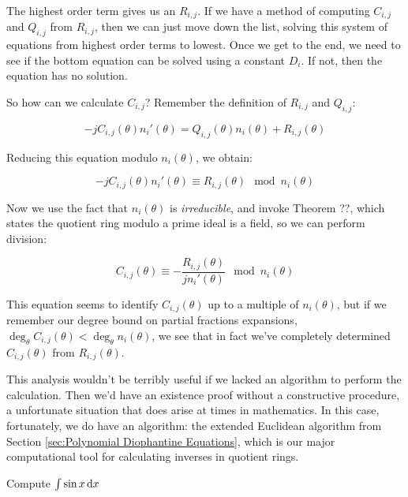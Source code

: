 The highest order term gives us an $R_{i,j}$.  If we have a method of
computing $C_{i,j}$ and $Q_{i,j}$ from $R_{i,j}$, then we can just
move down the list, solving this system of equations from highest
order terms to lowest.  Once we get to the end, we need to see if the
bottom equation can be solved using a constant $D_i$.  If not,
then the equation has no solution.

So how can we calculate $C_{i,j}$?  Remember the definition of
$R_{i,j}$ and $Q_{i,j}$:

$$-jC_{i,j}(\theta)n_i'(\theta) = Q_{i,j}(\theta) n_i(\theta) + R_{i,j}(\theta)$$

Reducing this equation modulo $n_i(\theta)$, we obtain:

$$-jC_{i,j}(\theta)n_i'(\theta) \equiv R_{i,j}(\theta) \mod n_i(\theta)$$

Now we use the fact that $n_i(\theta)$ is {\it irreducible},
and invoke Theorem ??, which states the quotient ring
modulo a prime ideal is a field, so we can perform division:

$$C_{i,j}(\theta) \equiv - \frac{R_{i,j}(\theta)}{jn_i'(\theta)} \mod n_i(\theta)$$

This equation seems to identify $C_{i,j}(\theta)$ up to a multiple of $n_i(\theta)$,
but if we remember our degree bound on partial fractions expansions,
$\deg_\theta C_{i,j}(\theta) < \deg_\theta n_i(\theta)$, we see
that in fact we've completely determined $C_{i,j}(\theta)$ from
$R_{i,j}(\theta)$.

This analysis wouldn't be terribly useful if we lacked an algorithm to
perform the calculation.  Then we'd have an existence proof without a
constructive procedure, a unfortunate situation that does arise at
times in mathematics.  In this case, fortunately, we do have an
algorithm: the extended Euclidean algorithm from
Section \ref{sec:Polynomial Diophantine Equations}, which is our major
computational tool for calculating inverses in quotient rings.



\begin{comment}
$$F' = \sum_{i=-l}^n (c_i' + i c_i k' )\theta^i
  + \sum_{i=1}^\nu \sum_{j=1}^{m_i} \frac{b_{ij}'(\theta) n_i(\theta) - j b_{ij}(\theta) n_i'(\theta) }{n_i(\theta)^{j+1}}
  + \sum_{i=1}^\eta d_i \frac{n_i(\theta)'}{n_i(\theta)}$$
\end{comment}

\vfil\eject

\example Compute $\int \sin x \, {\rm d}x$

